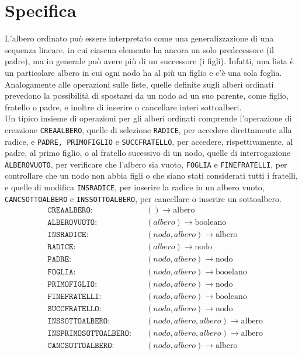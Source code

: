 \documentclass[12pt]{report}
\begin{document}
	\section{Specifica}
	L'albero ordinato può essere interpretato come una generalizzazione di una sequenza lineare, in cui ciascun elemento ha ancora un solo predecessore (il padre), ma in generale può avere più di un successore (i figli). Infatti, una lista è un particolare albero in cui ogni nodo ha al più un figlio e c'è una sola foglia. Analogamente alle operazioni sulle liste, quelle definite sugli alberi ordinati prevedono la possibilità di spostarsi da un nodo ad un suo parente, come figlio, fratello o padre, e inoltre di inserire o cancellare interi sottoalberi. \\
	Un tipico insieme di operazioni per gli alberi ordinati comprende l'operazione di creazione \texttt{CREAALBERO}, quelle di selezione \texttt{RADICE}, per accedere direttamente alla radice, e \texttt{PADRE, PRIMOFIGLIO} e \texttt{SUCCFRATELLO}, per accedere, rispettivamente, al padre, al primo figlio, o al fratello sucessivo di un nodo, quelle di interrogazione \texttt{ALBEROVUOTO}, per verificare che l'albero sia vuoto, \texttt{FOGLIA} e \texttt{FINEFRATELLI}, per controllare che un nodo non abbia figli o che siano stati considerati tutti i fratelli, e quelle di modifica \texttt{INSRADICE}, per inserire la radice in un albero vuoto, \texttt{CANCSOTTOALBERO} e \texttt{INSSOTTOALBERO}, per cancellare o inserire un sottoalbero.
	\begin{align*}
		&\texttt{CREAALBERO:} &\quad () \to \text{albero} \\
		&\texttt{ALBEROVUOTO:} &\quad (albero) \to \text{booleano} \\
		&\texttt{INSRADICE:} &\quad (nodo, albero) \to \text{albero} \\
		&\texttt{RADICE:} &\quad (albero) \to \text{nodo} \\
		&\texttt{PADRE:} &\quad (nodo, albero) \to \text{nodo} \\
		&\texttt{FOGLIA:} &\quad (nodo, albero) \to \text{booelano} \\
		&\texttt{PRIMOFIGLIO:} &\quad (nodo, albero) \to \text{nodo} \\
		&\texttt{FINEFRATELLI:} &\quad (nodo, albero) \to \text{booleano} \\
		&\texttt{SUCCFRATELLO:} &\quad (nodo, albero) \to \text{nodo} \\
		&\texttt{INSSOTTOALBERO:} &\quad (nodo, albero, albero) \to \text{albero} \\
		&\texttt{INSPRIMOSOTTOALBERO:} &\quad (nodo, albero, albero) \to \text{albero} \\
		&\texttt{CANCSOTTOALBERO:} &\quad (nodo, albero) \to \text{albero}
	\end{align*}
\end{document}
